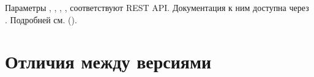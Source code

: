 \documentclass[a4paper,10pt,russian]{sphinxmanual}
\begin{document}
\sphinxAtStartPar
Параметры , , , ,  соответствуют REST API. Документация к ним доступна через .
Подробней см. {\hyperref[\detokenize{api:sub-chapter-rest-api}]{}} ().

\sphinxstepscope


\chapter{Отличия между версиями}
\label{\detokenize{versions:chapter-versions}}\label{\detokenize{versions:id1}}\label{\detokenize{versions::doc}}
\end{document}
